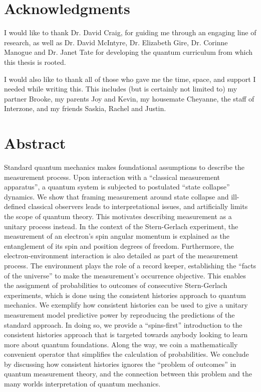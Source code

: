 
\chapter*{Acknowledgments}

I would like to thank Dr. David Craig, for guiding me through an engaging line of research, as well as Dr. David McIntyre, Dr. Elizabeth Gire, Dr. Corinne Manogue and Dr. Janet Tate for developing the quantum curriculum from which this thesis is rooted.

I would also like to thank all of those who gave me the time, space, and support I needed while writing this. This includes (but is certainly not limited to) my partner Brooke, my parents Joy and Kevin, my housemate Cheyanne, the staff of Interzone, and my friends Saskia, Rachel and Justin.

\clearpage


\chapter*{Abstract}

Standard quantum mechanics makes foundational assumptions to describe the measurement process. Upon interaction with a ``classical measurement apparatus'', a quantum system is subjected to postulated ``state collapse'' dynamics. We show that framing measurement around state collapse and ill-defined classical observers leads to interpretational issues, and artificially limits the scope of quantum theory. This motivates describing measurement as a unitary process instead. In the context of the Stern-Gerlach experiment, the measurement of an electron's spin angular momentum is explained as the entanglement of its spin and position degrees of freedom. Furthermore, the electron-environment interaction is also detailed as part of the measurement process. The environment plays the role of a record keeper, establishing the ``facts of the universe'' to make the measurement's occurrence objective. This enables the assignment of probabilities to outcomes of consecutive Stern-Gerlach experiments, which is done using the consistent histories approach to quantum mechanics. We exemplify how consistent histories can be used to give a unitary measurement model predictive power by reproducing the predictions of the standard approach. In doing so, we provide a ``spins-first'' introduction to the consistent histories approach that is targeted towards anybody looking to learn more about quantum foundations. Along the way, we coin a mathematically convenient operator that simplifies the calculation of probabilities. We conclude by discussing how consistent histories ignores the ``problem of outcomes'' in quantum measurement theory, and the connection between this problem and the many worlds interpretation of quantum mechanics.

